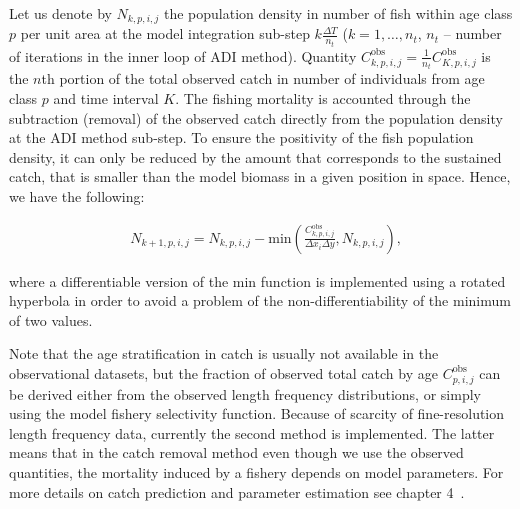 Let us denote by $N_{k,p,i,j}$ the population density in number of fish within age class $p$ per unit area at the model integration sub-step $k\frac{\Delta T}{n_t}$ ($k=1,\dots,n_t$, $n_t$ -- number of iterations in the inner loop of ADI method). Quantity $C^{\text{obs}}_{k,p,i,j}=\frac{1}{n_t}C^{\text{obs}}_{K,p,i,j}$ is the $n$th portion of the total observed catch in number of individuals from age class $p$ and time interval $K$. The fishing mortality is accounted through the subtraction (removal) of the observed catch directly from the population density at the ADI method sub-step. To ensure the positivity of the fish population density, it can only be reduced by the amount that corresponds to the sustained catch, that is smaller than the model biomass in a given position in space. Hence, we have the following:

\begin{align}
&N_{k+1,p,i,j} = N_{k,p,i,j}-\text{min}\left(\frac{C_{k,p,i,j}^{\text{obs}}}{\Delta x_i \Delta y}, N_{k,p,i,j}\right),
\label{eq:MCR}
\end{align}

\noindent where a differentiable version of the min function is implemented using a rotated hyperbola in order to avoid a problem of the non-differentiability of the minimum of two values.

Note that the age stratification in catch is usually not available in the observational datasets, but the fraction of observed total catch by age $C_{p,i,j}^{\text{obs}}$ can be derived either from the observed length frequency distributions, or simply using the model fishery selectivity function. Because of scarcity of fine-resolution length frequency data, currently the second method is implemented. The latter means that in the catch removal method even though we use the observed quantities, the mortality induced by a fishery depends on model parameters. For more details on catch prediction and parameter estimation see chapter 4~{}.


